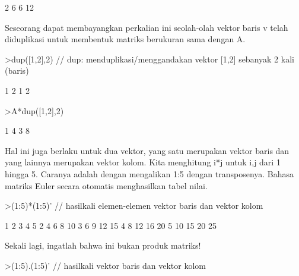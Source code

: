 \documentclass[a4paper,10pt]{article}
\begin{document}
\begin{eulernotebook}
\begin{eulercomment}
\begin{eulercomment}
\begin{eulercomment}
\begin{eulercomment}
\begin{eulercomment}
\begin{eulercomment}
\begin{euleroutput}
              2             6 
              6            12 
\end{euleroutput}
\begin{eulercomment}
Seseorang dapat membayangkan perkalian ini seolah-olah vektor baris v
telah diduplikasi untuk membentuk matriks berukuran sama dengan A.
\end{eulercomment}
\begin{eulerprompt}
>dup([1,2],2) // dup: menduplikasi/menggandakan vektor [1,2] sebanyak 2 kali (baris)
\end{eulerprompt}
\begin{euleroutput}
              1             2 
              1             2 
\end{euleroutput}
\begin{eulerprompt}
>A*dup([1,2],2) 
\end{eulerprompt}
\begin{euleroutput}
              1             4 
              3             8 
\end{euleroutput}
\begin{eulercomment}
Hal ini juga berlaku untuk dua vektor, yang satu merupakan vektor
baris dan yang lainnya merupakan vektor kolom. Kita menghitung i*j
untuk i,j dari 1 hingga 5. Caranya adalah dengan mengalikan 1:5 dengan
transposenya. Bahasa matriks Euler secara otomatis menghasilkan tabel
nilai.
\end{eulercomment}
\begin{eulerprompt}
>(1:5)*(1:5)' // hasilkali elemen-elemen vektor baris dan vektor kolom
\end{eulerprompt}
\begin{euleroutput}
              1             2             3             4             5 
              2             4             6             8            10 
              3             6             9            12            15 
              4             8            12            16            20 
              5            10            15            20            25 
\end{euleroutput}
\begin{eulercomment}
Sekali lagi, ingatlah bahwa ini bukan produk matriks!
\end{eulercomment}
\begin{eulerprompt}
>(1:5).(1:5)' // hasilkali vektor baris dan vektor kolom
\end{eulerprompt}
\begin{euleroutput}

\end{euleroutput}
\end{eulercomment}
\end{eulercomment}
\end{eulercomment}
\end{eulercomment}
\end{eulercomment}
\end{eulercomment}
\end{eulernotebook}
\end{document}
